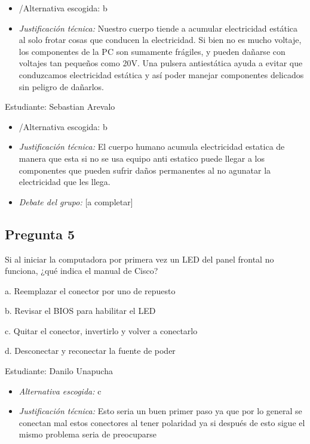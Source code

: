 \documentclass{article}
\begin{document}
\begin{itemize}
\item /Alternativa escogida: b
\item \emph{Justificación técnica:} Nuestro cuerpo tiende a acumular
electricidad estática al solo frotar cosas que conducen la
electricidad. Si bien no es mucho voltaje, los componentes de la PC
son sumamente frágiles, y pueden dañarse con voltajes tan pequeños
como 20V. Una pulsera antiestática ayuda a evitar que conduzcamos
electricidad estática y así poder manejar componentes delicados sin
peligro de dañarlos.
\end{itemize}

Estudiante: Sebastian Arevalo

\begin{itemize}
\item /Alternativa escogida: b
\item \emph{Justificación técnica:} El cuerpo humano acumula electricidad
estatica de manera que esta si no se usa equipo anti estatico puede
llegar a los componentes que pueden sufrir daños permanentes al no
agunatar la electricidad que les llega.
\end{itemize}


\begin{itemize}
\item \emph{Debate del grupo:} [a completar]
\end{itemize}


\subsection{Pregunta 5}
\label{sec:org9e45a7b}
Si al iniciar la computadora por primera vez un LED del panel frontal no funciona, ¿qué indica el manual de Cisco?

a. Reemplazar el conector por uno de repuesto

b. Revisar el BIOS para habilitar el LED

c. Quitar el conector, invertirlo y volver a conectarlo

d. Desconectar y reconectar la fuente de poder

Estudiante: Danilo Unapucha

\begin{itemize}
\item \emph{Alternativa escogida:} c
\item \emph{Justificación técnica:} Esto seria un buen primer paso ya que por
lo general se conectan mal estos conectores al tener polaridad ya si
después de esto sigue el mismo problema seria de preocuparse
\end{itemize}
\end{document}

